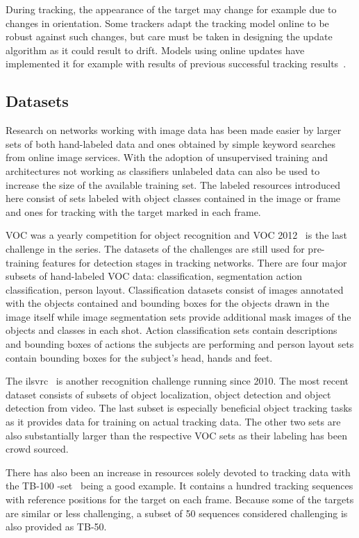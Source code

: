 During tracking, the appearance of the target may change for example due to changes in
orientation. Some trackers adapt the tracking model online to be robust against such
changes, but care must be taken in designing the update algorithm as it could result
to drift. Models using online updates have implemented it for example with results of
previous successful tracking results~\cite{BLUR_TRACK}.

\subsection{Datasets}
Research on networks working with image data has been made easier by larger sets of both
hand-labeled data and ones obtained by simple keyword searches from online image services.
With the adoption of unsupervised training and architectures not working as classifiers
unlabeled data can also be used to increase the size of the available training set.
The labeled resources introduced here consist of sets labeled with object classes contained
in the image or frame and ones for tracking with the target marked in each frame.

VOC was a yearly competition for object recognition and VOC 2012~\cite{VOC12} is the last
challenge in the series. The datasets of the challenges are still used for pre-training
features for detection stages in tracking networks. There are four major subsets of
hand-labeled VOC data: classification, segmentation action classification, person layout.
Classification datasets consist of images annotated with the objects contained and bounding
boxes for the objects drawn in the image itself while image segmentation sets provide
additional mask images of the objects and classes in each shot. Action classification sets
contain descriptions and bounding boxes of actions the subjects are performing and person
layout sets contain bounding boxes for the subject's head, hands and feet.

The \ac{ilsvrc}~\cite{ILSVRC15} is another recognition challenge running since 2010. The
most recent dataset consists of subsets of object localization, object detection and
object detection from video. The last subset is especially beneficial object tracking
tasks as it provides data for training on actual tracking data. The other two sets are also
substantially larger than the respective VOC sets as their labeling has been crowd sourced.

There has also been an increase in resources solely devoted to tracking data with the
TB-100 -set~\cite{VTB} being a good example. It contains a hundred tracking sequences
with reference positions for the target on each frame. Because some of the targets are
similar or less challenging, a subset of 50 sequences considered challenging is also
provided as TB-50.~\cite{OT_BENCH}

